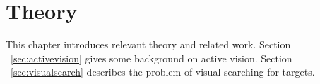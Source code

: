 \chapter{Theory}
\label{cha:theory}

% 
% 
% 
% 
% 
% 

This chapter introduces relevant theory and related work.
Section ~\ref{sec:activevision} gives some background on active vision.
Section ~\ref{sec:visualsearch} describes the problem of visual searching for targets.

